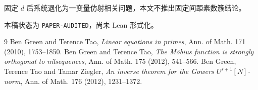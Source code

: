 \documentclass[11pt,a4paper]{ctexart}
\begin{document}
固定 \(d\) 后系统退化为一变量仿射相关问题，本文不推出固定间距素数簇结论。

本稿状态为 \texttt{PAPER-AUDITED}，尚未 Lean 形式化。

\begin{thebibliography}{9}
 Ben Green and Terence Tao, \emph{Linear equations in primes}, Ann. of Math. 171 (2010), 1753--1850.
 Ben Green and Terence Tao, \emph{The Möbius function is strongly orthogonal to nilsequences}, Ann. of Math. 175 (2012), 541--566.
 Ben Green, Terence Tao and Tamar Ziegler, \emph{An inverse theorem for the Gowers \(U^{s+1}[N]\)-norm}, Ann. of Math. 176 (2012), 1231--1372.
\end{thebibliography}
\end{document}
